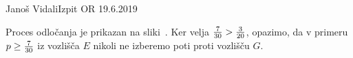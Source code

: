 \begin{naloga}{Janoš Vidali}{Izpit OR 19.6.2019}
\begin{odgovor}
Proces odločanja je prikazan na sliki~.
Ker velja ${7 \over 30} > {3 \over 20}$, opazimo,
da v primeru $p \ge {7 \over 30}$ iz vozlišča $E$
nikoli ne izberemo poti proti vozlišču $G$.
%
\begin{slika}
\end{slika}
\end{odgovor}
\end{naloga}
